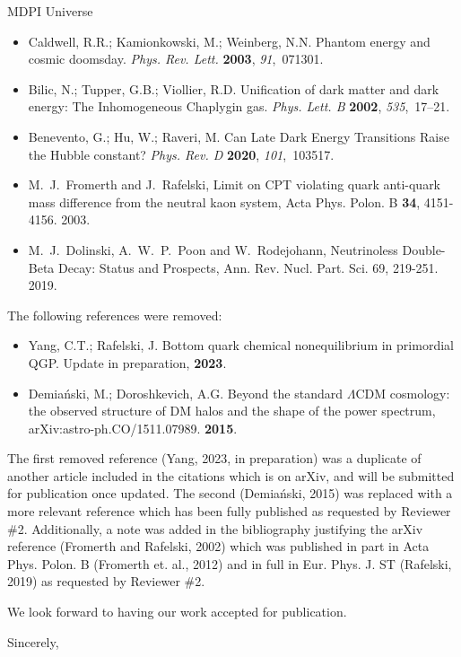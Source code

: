 \documentclass[a4paper, 10pt]{letter}
\begin{document}
\begin{letter}{MDPI Universe}
\begin{itemize}
    \item Caldwell, R.R.; Kamionkowski, M.; Weinberg, N.N. {Phantom energy and cosmic doomsday}. {\em Phys. Rev. Lett.} {\bf 2003}, {\em 91},~071301.
    \item Bilic, N.; Tupper, G.B.; Viollier, R.D. {Unification of dark matter and dark energy: The Inhomogeneous Chaplygin gas}. {\em Phys. Lett. B} {\bf 2002}, {\em 535},~17--21.
    \item Benevento, G.; Hu, W.; Raveri, M. {Can Late Dark Energy Transitions Raise the Hubble constant?} {\em Phys. Rev. D} {\bf 2020}, {\em 101},~103517.
    \item M.~J.~Fromerth and J.~Rafelski, {Limit on CPT violating quark anti-quark mass difference from the neutral kaon system}, Acta Phys. Polon. B \textbf{34}, 4151-4156. 2003.
    \item M.~J.~Dolinski, A.~W.~P.~Poon and W.~Rodejohann, {Neutrinoless Double-Beta Decay: Status and Prospects}, Ann. Rev. Nucl. Part. Sci. 69, 219-251. 2019.
\end{itemize}

The following references were removed:
\begin{itemize}
    \item Yang, C.T.; Rafelski, J. {Bottom quark chemical nonequilibrium in primordial QGP}. Update in preparation, {\bf 2023}.
    \item Demia\'nski, M.; Doroshkevich, A.G. {Beyond the standard $\Lambda$CDM cosmology: the observed structure of DM halos and the shape of the power spectrum}, arXiv:astro-ph.CO/1511.07989. {\bf 2015}.
\end{itemize}
The first removed reference (Yang, 2023, in preparation) was a duplicate of another article included in the citations which is on arXiv, and will be submitted for publication once updated. The second (Demia\'nski, 2015) was replaced with a more relevant reference which has been fully published as requested by Reviewer \#2. Additionally, a note was added in the bibliography justifying the arXiv reference (Fromerth and Rafelski, 2002) which was published in part in Acta Phys. Polon. B (Fromerth et. al., 2012) and in full in Eur. Phys. J. ST (Rafelski, 2019) as requested by Reviewer \#2.


We look forward to having our work accepted for publication.

\closing{Sincerely,}

\end{letter}
\end{document}

